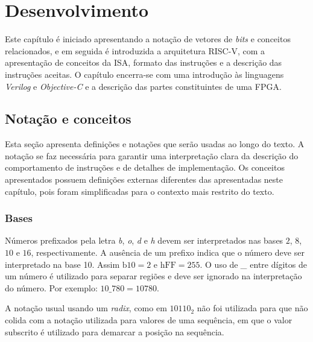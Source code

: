 
\chapter{Desenvolvimento}
\label{cap:2}

Este capítulo é iniciado apresentando a notação de vetores de \emph{bits} e
conceitos relacionados, e em seguida é introduzida a
arquitetura RISC-V, com a apresentação de conceitos da ISA,
formato das instruções e a descrição das instruções aceitas.
O capítulo encerra-se com uma introdução às linguagens \emph{Verilog}
e \emph{Objective-C} e a descrição das partes constituintes de uma FPGA.

\section{Notação e conceitos}
\label{sec:not}

  Esta seção apresenta definições e notações que serão usadas ao longo do texto.
  A notação se faz necessária para garantir uma interpretação clara da descrição do
  comportamento de instruções e de detalhes de implementação. Os conceitos
  apresentados possuem definições externas diferentes das apresentadas 
  neste capítulo, pois foram simplificadas para o contexto mais restrito do texto.

\subsection{Bases}
\label{sec:bases}

  Números prefixados pela letra \emph{b}, \emph{o}, \emph{d} e \emph{h} devem ser 
  interpretados nas bases $2$, $8$, $10$ e $16$, respectivamente. A ausência de um 
  prefixo indica que o número deve ser interpretado na base 10. Assim 
  $ \text{b}10 = 2 $ e $ \text{hFF} = 255 $. O uso de \emph{\_} entre dígitos de um número é utilizado para separar regiões
  e deve ser ignorado na interpretação do número. Por exemplo: $ 10\_780 = 10780 $.

  A notação usual usando um \emph{radix}, como em $10110_2$ não foi utilizada para 
  que não colida com a notação utilizada para valores de uma sequência, em que o valor
  subscrito é utilizado para demarcar a posição na sequência.

